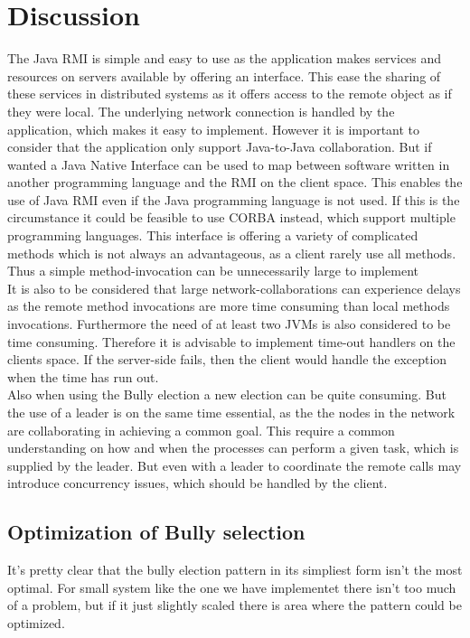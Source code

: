 \documentclass[Main]{subfiles}
\begin{document}
\section{Discussion}
The Java RMI is simple and easy to use as the application makes services and resources on servers available by offering an interface. This ease the sharing of these services in distributed systems as it offers access to the remote object as if they were local. The underlying network connection is handled by the application, which makes it easy to implement. However it is important to consider that the application only support Java-to-Java collaboration. But if wanted a Java Native Interface can be used to map between software written in another programming language and the RMI on the client space. This enables the use of Java RMI even if the Java programming language is not used. If this is the circumstance it could be feasible to use CORBA instead, which support multiple programming languages. This interface is offering a variety of complicated methods which is not always an advantageous, as a client rarely use all methods. Thus a simple method-invocation can be unnecessarily large to implement\\It is also to be considered that large network-collaborations can experience delays as the remote method invocations are more time consuming than local methods invocations. Furthermore the need of at least two JVMs is also considered to be time consuming. Therefore it is advisable to implement time-out handlers on the clients space. If the server-side fails, then the client would handle the exception when the time has run out.\\Also when using the Bully election a new election can be quite consuming. But the use of a leader is on the same time essential, as the the nodes in the network are collaborating in achieving a common goal. This require a common understanding on how and when the processes can perform a given task, which is supplied by the leader. But even with a leader to coordinate the remote calls may introduce concurrency issues, which should be handled by the client.

\subsection{Optimization of Bully selection}
It's pretty clear that the bully election pattern in its simpliest form isn't the most optimal. For small system like the one we have implementet there isn't too much of a problem, but if it just slightly scaled there is area where the pattern could be optimized.
\end{document}
